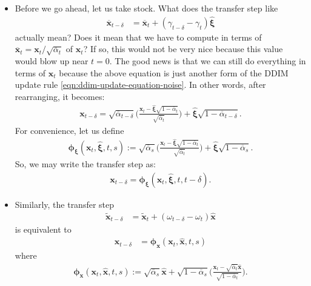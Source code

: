 \documentclass[10pt]{article}
\newcommand{\ve}[1]{\mathbf{#1}}
\newcommand{\ves}[1]{\boldsymbol{#1}}
\newcommand{\ov}[1]{\overline{#1}}
\begin{document}
\begin{itemize}
  \item Before we go ahead, let us take stock. What does the transfer step like
  \begin{align*}
    \ov{\ve{x}}_{t-\delta} &= \ov{\ve{x}}_{t} + (\gamma_{t - \delta} - \gamma_{t}) \widehat{\ves{\xi}}
  \end{align*}
  actually mean? Does it mean that we have to compute in terms of $\ov{\ve{x}}_{t} = \ve{x}_t / \sqrt{\ov{\alpha}_t}$ of $\ve{x}_t$? If so, this would not be very nice because this value would blow up near $t = 0$. The good news is that we can still do everything in terms of $\ve{x}_t$ because the above equation is just another form of the DDIM update rule \eqref{eqn:ddim-update-equation-noise}. In other words, after rearranging, it becomes:
  \begin{align*}
    \ve{x}_{t-\delta}  = \sqrt{\ov{\alpha}_{t-\delta}} \bigg( \frac{\ve{x}_t - \widehat{\ves{\xi}} \sqrt{1-\ov{\alpha}_t}  }{\sqrt{\ov{\alpha}_t}} \bigg) +  \widehat{\ves{\xi}} \sqrt{1 - \ov{\alpha}_{t-\delta}}.
  \end{align*}
  For convenience, let us define
  \begin{align*}
    \ves{\phi}_{\ves{\xi}}(\ve{x}_t, \widehat{\ves{\xi}}, t, s) := \sqrt{\ov{\alpha}_{s}} \bigg( \frac{\ve{x}_t - \widehat{\ves{\xi}} \sqrt{1-\ov{\alpha}_t}  }{\sqrt{\ov{\alpha}_t}} \bigg) +  \widehat{\ves{\xi}} \sqrt{1 - \ov{\alpha}_{s}}.
  \end{align*}
  So, we may write the transfer step as:
  \begin{align*}
    \ve{x}_{t-\delta}  = \ves{\phi}_{\ves{\xi}}(\ve{x}_t, \widehat{\ves{\xi}}, t, t-\delta).
  \end{align*}

  \item Similarly, the transfer step
  \begin{align*}
    \widetilde{\ve{x}}_{t-\delta} &= \widetilde{\ve{x}}_{t} + (\omega_{t - \delta} - \omega_{t}) \widehat{\ves{x}}
  \end{align*}
  is equivalent to
  \begin{align*}
    \ve{x}_{t-\delta} &= \ves{\phi}_{\ve{x}}(\ve{x}_t, \widehat{\ve{x}}, t, s)
  \end{align*}
  where 
  \begin{align*}
    \ves{\phi}_{\ve{x}}(\ve{x}_t, \widehat{\ve{x}}, t, s) := \sqrt{\ov{\alpha}_s} \widehat{\ve{x}} + \sqrt{1 - \ov{\alpha}_s} \bigg( \frac{\ve{x}_t - \sqrt{\ov{\alpha}_t} \widehat{\ve{x}}}{\sqrt{1 - \ov{\alpha}_t}} \bigg).
  \end{align*}


\end{itemize}
\end{document}
